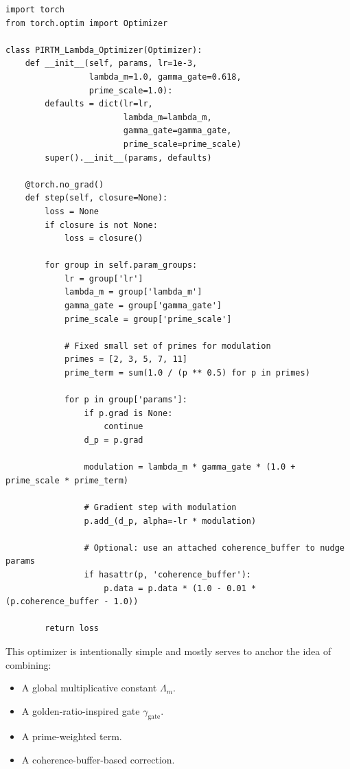 \documentclass[11pt]{article}
\begin{document}
\begin{verbatim}
import torch
from torch.optim import Optimizer

class PIRTM_Lambda_Optimizer(Optimizer):
    def __init__(self, params, lr=1e-3,
                 lambda_m=1.0, gamma_gate=0.618,
                 prime_scale=1.0):
        defaults = dict(lr=lr,
                        lambda_m=lambda_m,
                        gamma_gate=gamma_gate,
                        prime_scale=prime_scale)
        super().__init__(params, defaults)

    @torch.no_grad()
    def step(self, closure=None):
        loss = None
        if closure is not None:
            loss = closure()

        for group in self.param_groups:
            lr = group['lr']
            lambda_m = group['lambda_m']
            gamma_gate = group['gamma_gate']
            prime_scale = group['prime_scale']

            # Fixed small set of primes for modulation
            primes = [2, 3, 5, 7, 11]
            prime_term = sum(1.0 / (p ** 0.5) for p in primes)

            for p in group['params']:
                if p.grad is None:
                    continue
                d_p = p.grad

                modulation = lambda_m * gamma_gate * (1.0 + prime_scale * prime_term)

                # Gradient step with modulation
                p.add_(d_p, alpha=-lr * modulation)

                # Optional: use an attached coherence_buffer to nudge params
                if hasattr(p, 'coherence_buffer'):
                    p.data = p.data * (1.0 - 0.01 * (p.coherence_buffer - 1.0))

        return loss
\end{verbatim}

This optimizer is intentionally simple and mostly serves to anchor the idea of combining:

\begin{itemize}
  \item A global multiplicative constant $\Lambda_m$.
  \item A golden-ratio-inspired gate $\gamma_{\text{gate}}$.
  \item A prime-weighted term.
  \item A coherence-buffer-based correction.
\end{itemize}
\end{document}
